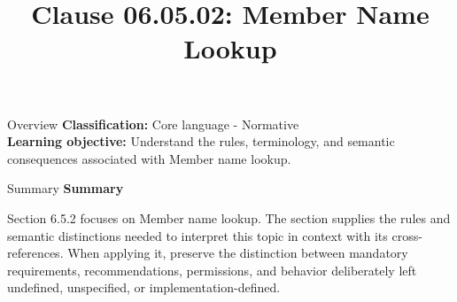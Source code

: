 \documentclass[10pt,letterpaper]{article}
\title{Clause 06.05.02: Member Name Lookup}
\author{}
\date{}
\begin{document}
\maketitle
\begin{CornellOverviewBox}{Overview}
\textbf{Classification:} Core language - Normative\\[2pt]
\textbf{Learning objective:} Understand the rules, terminology, and semantic consequences associated with Member name lookup.
\end{CornellOverviewBox}\begin{CornellSummaryBox}{Summary}
{\sffamily\bfseries\color{Accent} Summary}\par\vspace{3pt}Section 6.5.2 focuses on Member name lookup. The section supplies the rules and semantic distinctions needed to interpret this topic in context with its cross-references. When applying it, preserve the distinction between mandatory requirements, recommendations, permissions, and behavior deliberately left undefined, unspecified, or implementation-defined.
\end{CornellSummaryBox}
\end{document}
